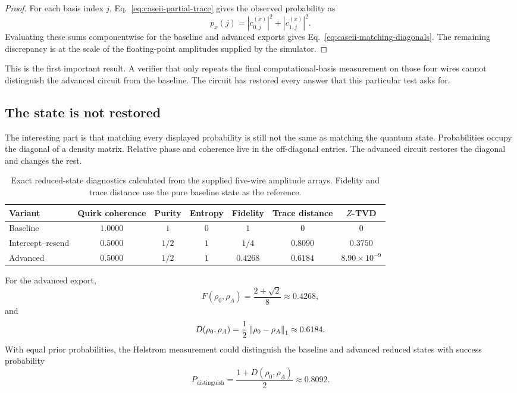 \begin{proof}
For each basis index $j$, Eq.~\eqref{eq:caseii-partial-trace} gives the observed
probability as
\begin{equation}
  p_x(j)=|c^{(x)}_{0,j}|^2+|c^{(x)}_{1,j}|^2.
\end{equation}
Evaluating these sums componentwise for the baseline and advanced exports gives
Eq.~\eqref{eq:caseii-matching-diagonals}. The remaining discrepancy is at the
scale of the floating-point amplitudes supplied by the simulator.
\end{proof}

This is the first important result. A verifier that only repeats the final
computational-basis measurement on those four wires cannot distinguish the
advanced circuit from the baseline. The circuit has restored every answer that
this particular test asks for.

\subsection{The state is not restored}

The interesting part is that matching every displayed probability is still not
the same as matching the quantum state. Probabilities occupy the diagonal of a
density matrix. Relative phase and coherence live in the off-diagonal entries.
The advanced circuit restores the diagonal and changes the rest.

\begin{table}[ht]
\centering
\caption{Exact reduced-state diagnostics calculated from the supplied
five-wire amplitude arrays. Fidelity and trace distance use the pure baseline
state as the reference.}
\label{tab:caseii-density-metrics}
\begin{tabular}{@{}lcccccc@{}}
\toprule
Variant & Quirk coherence & Purity & Entropy & Fidelity & Trace distance & $Z$-TVD\\
\midrule
Baseline & $1.0000$ & $1$ & $0$ & $1$ & $0$ & $0$\\
Intercept--resend & $0.5000$ & $1/2$ & $1$ & $1/4$ & $0.8090$ & $0.3750$\\
Advanced & $0.5000$ & $1/2$ & $1$ & $0.4268$ & $0.6184$ & $8.90\times10^{-9}$\\
\bottomrule
\end{tabular}
\end{table}

For the advanced export,
\begin{equation}
  F(\rho_0,\rho_A)
  =\frac{2+\sqrt2}{8}
  \approx0.4268,
  \label{eq:caseii-fidelity}
\end{equation}
and
\begin{equation}
  D(\rho_0,\rho_A)
  =\frac12\left\lVert \rho_0-\rho_A\right\rVert_1
  \approx0.6184.
  \label{eq:caseii-trace-distance}
\end{equation}
With equal prior probabilities, the Helstrom measurement could distinguish the
baseline and advanced reduced states with success probability
\begin{equation}
  P_{\mathrm{distinguish}}
  =\frac{1+D(\rho_0,\rho_A)}{2}
  \approx0.8092.
  \label{eq:caseii-helstrom}
\end{equation}

